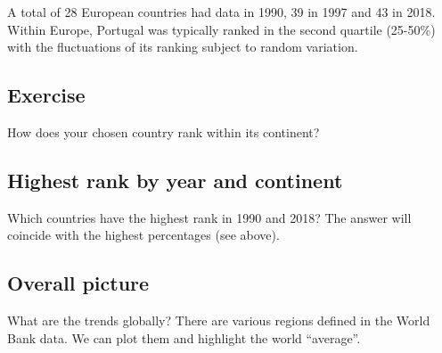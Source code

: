 \documentclass[a4paper,9pt,twocolumn,twoside,printwatermark=false]{pinp}
\begin{document}
A total of 28 European countries had data in 1990, 39 in 1997 and 43 in
2018. Within Europe, Portugal was typically ranked in the second
quartile (25-50\%) with the fluctuations of its ranking subject to
random variation.

\subsection{Exercise}\label{exercise-6}

How does your chosen country rank within its continent?

\subsection{Highest rank by year and
continent}\label{highest-rank-by-year-and-continent}

Which countries have the highest rank in 1990 and 2018? The answer will
coincide with the highest percentages (see above).

\begin{Shaded}
\end{Shaded}

\subsection{Overall picture}\label{overall-picture}

What are the trends globally? There are various regions defined in the
World Bank data. We can plot them and highlight the world ``average''.
\end{document}
